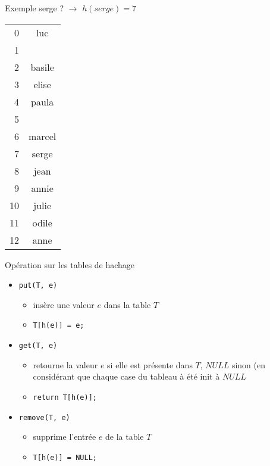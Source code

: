 \documentclass{beamer}
\begin{document}
  \begin{frame}{Exemple}
    serge ? $\rightarrow$ $h(serge) = 7$
    \begin{table}[]
\centering
\begin{tabular}{r|c|}
\cline{2-2}
0  & luc    \\ \cline{2-2}
1  &        \\ \cline{2-2}
2  & basile \\ \cline{2-2}
3  & elise                       \\ \cline{2-2}
4  & paula                       \\ \cline{2-2}
5  &                             \\ \cline{2-2}
6  & marcel                      \\ \cline{2-2}
7  & serge                       \\ \cline{2-2}
8  & jean                        \\ \cline{2-2}
9  & annie                       \\ \cline{2-2}
10 & julie                       \\ \cline{2-2}
11 & odile                       \\ \cline{2-2}
12 & anne                        \\ \cline{2-2}
\end{tabular}
\end{table}
  \end{frame}

  \begin{frame}{Opération sur les tables de hachage}
    \begin{itemize}
      \item{\texttt{put(T, e)}}
      \begin{itemize}
        \item{insère une valeur $e$ dans la table $T$}
        \item{\texttt{T[h(e)] = e;}}
      \end{itemize}
      \item{\texttt{get(T, e)}}
      \begin{itemize}
        \item{retourne la valeur $e$ si elle est présente dans $T$, $NULL$ sinon (en considérant que chaque case du tableau à été init à $NULL$}
        \item{\texttt{return T[h(e)];}}
      \end{itemize}
      \item{\texttt{remove(T, e)}}
      \begin{itemize}
        \item{supprime l'entrée $e$ de la table $T$}
        \item{\texttt{T[h(e)] = NULL;}}
      \end{itemize}
    \end{itemize}
  \end{frame}
\end{document}
